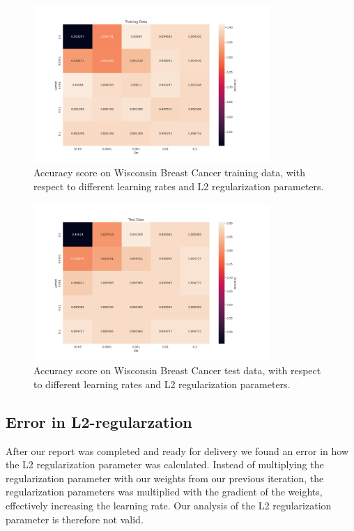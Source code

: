 \begin{figure}[H]
    \centering
    \includegraphics[width=0.8\textwidth]{Figures/PartE/e_heatmap_train_lambd_vs_eta_gamma_0_9_epochs_200.png}
    \caption{Accuracy score on Wisconsin Breast Cancer training data, with
    respect to different learning rates and L2 regularization parameters.}  
    \label{fig:e_heatmap_train_lambd_vs_eta_gamma_0_9_epochs_200} 
\end{figure}


\begin{figure}[H]
    \centering
    \includegraphics[width=0.8\textwidth]{Figures/PartE/e_heatmap_test_lambd_vs_eta_gamma_0_9_epochs_200.png}
    \caption{Accuracy score on Wisconsin Breast Cancer test data, with
    respect to different learning rates and L2 regularization parameters.}  
    \label{fig:e_heatmap_test_lambd_vs_eta_gamma_0_9_epochs_200} 
\end{figure}


\subsection{Error in L2-regularzation} \label{sec:error_l2_regularization} 
After our report was completed and ready for delivery we found an error in how
the L2 regularization parameter was calculated. Instead of multiplying the
regularization parameter with our weights from our previous iteration, the
regularization parameters was multiplied with the gradient of the weights,
effectively increasing the learning rate. Our analysis of the L2 regularization
parameter is therefore not valid.









